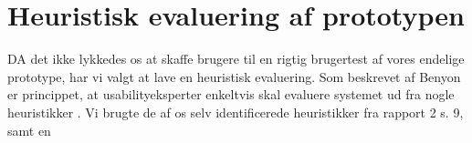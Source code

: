 \section{Heuristisk evaluering af prototypen}
DA det ikke lykkedes os at skaffe brugere til en rigtig brugertest af vores endelige prototype, har
vi valgt at lave en heuristisk evaluering. Som beskrevet af Benyon er princippet, at usabilityeksperter
enkeltvis skal evaluere systemet ud fra nogle heuristikker \cite[s. 228]{Benyon2010}. Vi brugte de
af os selv identificerede heuristikker fra rapport 2 s. 9, samt en 
